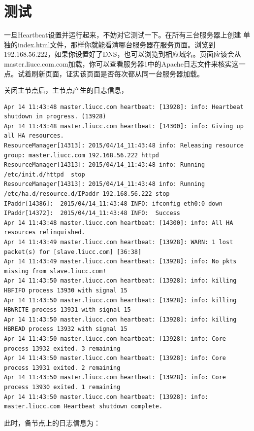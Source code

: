 \section{测试}

一旦Heartbeat设置并运行起来，不妨对它测试一下。在所有三台服务器上创建
单独的index.html文件，那样你就能看清哪台服务器在服务页面。浏览到
192.168.56.222，如果你设置好了DNS，也可以浏览到相应域名。页面应该会从
master.liucc.com.com加载，你可以查看服务器1中的Apache日志文件来核实这一
点。试着刷新页面，证实该页面是否每次都从同一台服务器加载。

关闭主节点后，主节点产生的日志信息，

\begin{verbatim}
Apr 14 11:43:48 master.liucc.com heartbeat: [13928]: info: Heartbeat shutdown in progress. (13928)
Apr 14 11:43:48 master.liucc.com heartbeat: [14300]: info: Giving up all HA resources.
ResourceManager[14313]:	2015/04/14_11:43:48 info: Releasing resource group: master.liucc.com 192.168.56.222 httpd
ResourceManager[14313]:	2015/04/14_11:43:48 info: Running /etc/init.d/httpd  stop
ResourceManager[14313]:	2015/04/14_11:43:48 info: Running /etc/ha.d/resource.d/IPaddr 192.168.56.222 stop
IPaddr[14386]:	2015/04/14_11:43:48 INFO: ifconfig eth0:0 down
IPaddr[14372]:	2015/04/14_11:43:48 INFO:  Success
Apr 14 11:43:48 master.liucc.com heartbeat: [14300]: info: All HA resources relinquished.
Apr 14 11:43:49 master.liucc.com heartbeat: [13928]: WARN: 1 lost packet(s) for [slave.liucc.com] [36:38]
Apr 14 11:43:49 master.liucc.com heartbeat: [13928]: info: No pkts missing from slave.liucc.com!
Apr 14 11:43:50 master.liucc.com heartbeat: [13928]: info: killing HBFIFO process 13930 with signal 15
Apr 14 11:43:50 master.liucc.com heartbeat: [13928]: info: killing HBWRITE process 13931 with signal 15
Apr 14 11:43:50 master.liucc.com heartbeat: [13928]: info: killing HBREAD process 13932 with signal 15
Apr 14 11:43:50 master.liucc.com heartbeat: [13928]: info: Core process 13932 exited. 3 remaining
Apr 14 11:43:50 master.liucc.com heartbeat: [13928]: info: Core process 13931 exited. 2 remaining
Apr 14 11:43:50 master.liucc.com heartbeat: [13928]: info: Core process 13930 exited. 1 remaining
Apr 14 11:43:50 master.liucc.com heartbeat: [13928]: info: master.liucc.com Heartbeat shutdown complete.
\end{verbatim}

此时，备节点上的日志信息为：

